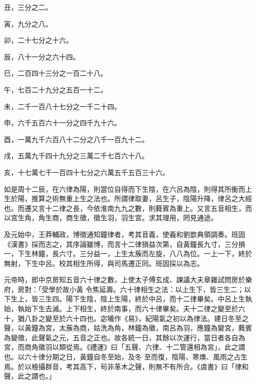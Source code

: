 \begin{pinyinscope}
 丑，三分之二。



 寅，九分之八。



 卯，二十七分之十六。



 辰，八十一分之六十四。



 巳，二百四十三分之一百二十八。



 午，七百二十九分之五百一十二。



 未，二千一百八十七分之一千二十四。



 申，六千五百六十一分之四千九十六。



 酉，一萬九千六百八十二分之八千一百九十二。



 戌，五萬九千四十九分之三萬二千七百六十八。



 亥，十七萬七千一百四十七分之六萬五千五百三十六。



 如是周十二辰，在六律為陽，則當位自得而下生陰，在六呂為陰，則得其所衡而上生於陽，推算之術無重上生之法也。所謂律取妻，呂生子，陰陽升降，律呂之大經
 也。而遷又言十二律之長，今依淮南九九之數，則蕤賓為重上。又言五音相生，而以宮生角，角生商，商生徵，徵生羽，羽生宮。求其理用，罔見通途。



 及元始中，王莽輔政，博徵通知鐘律者，考其音義，使羲和劉歆典領調奏。班固《漢書》採而志之，其序論雖博，而言十二律損益次第，自黃鐘長九寸，三分損一，下生林鐘，長六寸。三分益一，上生太蔟而左旋，八八為位。一上一下，終於無射，下生中呂。校其相生所得，與司馬遷正同。班固採以為志。



 元帝時，郎中京房知五音六十律之數，上使太子傅玄成、諫議大夫章雜試問房於樂府，房對：「受學於故小黃
 令焦延壽。六十律相生之法：以上生下，皆三生二；以下生上，皆三生四。陽下生陰，陰上生陽，終於中呂，而十二律畢矣。中呂上生執始，執始下生去滅。上下相生，終於南事，而六十律畢矣。夫十二律之變至於六十，猶八卦之變至於六十四也。宓犧作《易》，紀陽氣之初以為律法。建日冬至之聲，以黃鐘為宮，太蔟為商，姑洗為角，林鐘為徽，南呂為羽，應鐘為變宮，蕤賓為變徵，此聲氣之元，五音之正也。故各統一日，其餘以次運行，當日者各自為宮，而商角徽羽以類從焉。《禮運》曰「五聲、六律、十二管還相為宮」，此之謂也。以六十律分期之日，黃鐘自冬至始，及冬
 至而復，陰陽、寒燠、風雨之占生焉。於以檢攝群音，考其高下，茍非革木之聲，則無不有所合。《虞書》曰「律和聲，此之謂也。」




\end{pinyinscope}
